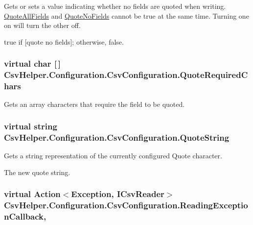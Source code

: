 Gets or sets a value indicating whether no fields are quoted when writing. \hyperlink{a00043_a04022216f3e425eddb2eea8b78425066}{Quote\-All\-Fields} and \hyperlink{a00043_aa9d54725d696095030d1f4c94825f438}{Quote\-No\-Fields} cannot be true at the same time. Turning one on will turn the other off. 

{\ttfamily true} if \mbox{[}quote no fields\mbox{]}; otherwise, {\ttfamily false}. \hypertarget{a00043_a6a01a3fdad14994f306530cdce2db6f6}{
\subsubsection[{Quote\-Required\-Chars}]{\setlength{\rightskip}{0pt plus 5cm}virtual char \mbox{[}$\,$\mbox{]} Csv\-Helper.\-Configuration.\-Csv\-Configuration.\-Quote\-Required\-Chars\hspace{0.3cm}{\ttfamily [get]}}}\label{a00043_a6a01a3fdad14994f306530cdce2db6f6}


Gets an array characters that require the field to be quoted. 

\hypertarget{a00043_a8816c29ce809570b4db6bc438f5e0204}{
\subsubsection[{Quote\-String}]{\setlength{\rightskip}{0pt plus 5cm}virtual string Csv\-Helper.\-Configuration.\-Csv\-Configuration.\-Quote\-String\hspace{0.3cm}{\ttfamily [get]}}}\label{a00043_a8816c29ce809570b4db6bc438f5e0204}


Gets a string representation of the currently configured Quote character. 

The new quote string. \hypertarget{a00043_ae7257970a1b5bfb9f2ddfdc61a70fe34}{
\subsubsection[{Reading\-Exception\-Callback}]{\setlength{\rightskip}{0pt plus 5cm}virtual Action$<$Exception, {\bf I\-Csv\-Reader}$>$ Csv\-Helper.\-Configuration.\-Csv\-Configuration.\-Reading\-Exception\-Callback\hspace{0.3cm}{\ttfamily [get]}, {\ttfamily [set]}}}\label{a00043_ae7257970a1b5bfb9f2ddfdc61a70fe34}


